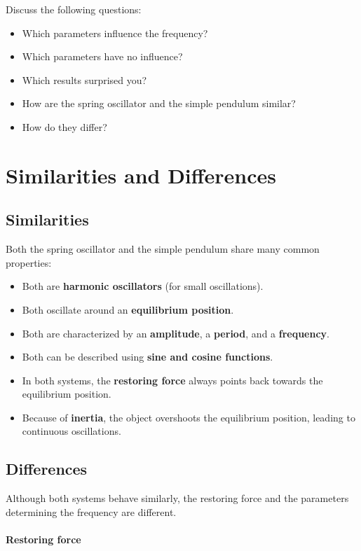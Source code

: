 \documentclass[a4paper,11pt]{article}
\begin{document}
Discuss the following questions:

\begin{itemize}
    \item Which parameters influence the frequency?
    \item Which parameters have no influence?
    \item Which results surprised you?
    \item How are the spring oscillator and the simple pendulum similar?
    \item How do they differ?
\end{itemize}


\section{Similarities and Differences}

\subsection*{Similarities}

Both the spring oscillator and the simple pendulum share many common properties:

\begin{itemize}
    \item Both are \textbf{harmonic oscillators} (for small oscillations).
    \item Both oscillate around an \textbf{equilibrium position}.
    \item Both are characterized by an \textbf{amplitude}, a \textbf{period}, and a \textbf{frequency}.
    \item Both can be described using \textbf{sine and cosine functions}.
    \item In both systems, the \textbf{restoring force} always points back towards the equilibrium position.
    \item Because of \textbf{inertia}, the object overshoots the equilibrium position, leading to continuous oscillations.
\end{itemize}

\subsection*{Differences}

Although both systems behave similarly, the restoring force and the parameters determining the frequency are different.

\paragraph{Restoring force}
\end{document}
